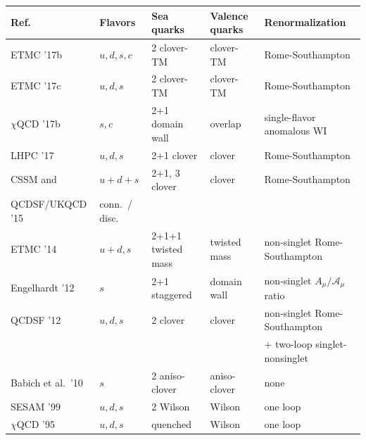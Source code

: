 \begin{table}[!t]
\renewcommand{\arraystretch}{1.2} 
\centering
\footnotesize
\begin{threeparttable}
\begin{tabular}{lllll}
\toprule
Ref. & Flavors & Sea quarks & Valence quarks & Renormalization \\
\midrule

  ETMC '17b \cite{Alexandrou:2017hac} &
  $u,d,s,c$ & 2 clover-TM & clover-TM & Rome-Southampton \\

  ETMC '17c \cite{Alexandrou:2017oeh} &
  $u,d,s$ & 2 clover-TM & clover-TM & Rome-Southampton \\

  $\chi$QCD '17b \cite{Gong:2015iir} &
  $s,c$ & 2+1 domain wall & overlap & single-flavor anomalous WI \\

  LHPC '17 \cite{Green:2017keo} &
  $u,d,s$ & 2+1 clover & clover & Rome-Southampton \\

  CSSM and &
  $u+d+s$ &
  2+1, 3 clover & clover & Rome-Southampton \\
  QCDSF/UKQCD '15 \cite{Chambers:2015bka} & conn.\ / disc. & & & \\

  ETMC '14 \cite{Abdel-Rehim:2013wlz} &
  $u+d,s$ & 2+1+1 twisted mass & twisted mass & non-singlet Rome-Southampton\\

  Engelhardt '12 \cite{Engelhardt:2012gd} &
  $s$ & 2+1 staggered & domain wall & non-singlet $A_\mu/\mathcal{A}_\mu$ ratio \\

  QCDSF '12 \cite{QCDSF:2011aa} &
  $u,d,s$ & 2 clover & clover & non-singlet Rome-Southampton \\
  & & & &+ two-loop singlet-nonsinglet\\

  Babich et al.\ '10 \cite{Babich:2010at} &
  $s$ & 2 aniso-clover & aniso-clover & none \\

  SESAM '99 \cite{Gusken:1999as} &
  $u,d,s$ & 2 Wilson & Wilson & one loop \\

  $\chi$QCD '95 \cite{Dong:1995rx} &
  $u,d,s$ & quenched & Wilson & one loop \\


\end{tabular}
\end{threeparttable}
\end{table}
